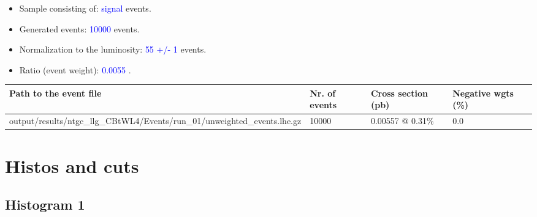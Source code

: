 \documentclass[a4paper, 10pt]{article}
\begin{document}
\begin{itemize}
  \item Sample consisting of: \textcolor{blue}{signal}  events.
   \item Generated events: \textcolor{blue}{10000 }  events.
   \item Normalization to the luminosity: \textcolor{blue}{55}\textcolor{blue}{ +/\-- }\textcolor{blue}{1 }  events.
   \item Ratio (event weight): \textcolor{blue}{0.0055 } .  
 
\end{itemize}
\begin{table}[H]
  \begin{center}
    \begin{tabular}{|m{55.0mm}|m{25.0mm}|m{30.0mm}|m{30.0mm}|}
      \hline
      {\cellcolor{yellow}         Path to the event file}& {\cellcolor{yellow}         Nr. of events}& {\cellcolor{yellow}         Cross section (pb)}& {\cellcolor{yellow}         Negative wgts (\%)}\\
      \hline
      {\cellcolor{white}          output/\-results/\-ntgc\_llg\_CBtWL4/\-Events/\-run\_01/\-unweighted\_events.lhe.gz}& {\cellcolor{white}          10000}& {\cellcolor{white}          0.00557 @ 0.31\%}& {\cellcolor{white}          0.0}\\
\hline
    \end{tabular}
  \end{center}
\end{table}

\newpage
\section{ Histos and cuts}

\subsection{ Histogram 1}
\end{document}
